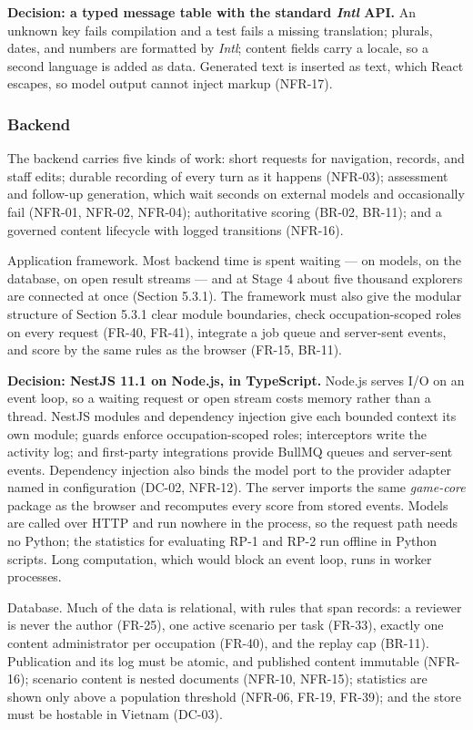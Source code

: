 \textbf{Decision: a typed message table with the standard \textit{Intl} API.} An unknown key fails compilation and a test fails a missing translation; plurals, dates, and numbers are formatted by \textit{Intl}\cite{r149}; content fields carry a locale, so a second language is added as data. Generated text is inserted as text, which React escapes, so model output cannot inject markup (NFR-17)\cite{r150}.

\subsubsection{Backend}

The backend carries five kinds of work: short requests for navigation, records, and staff edits; durable recording of every turn as it happens (NFR-03); assessment and follow-up generation, which wait seconds on external models and occasionally fail (NFR-01, NFR-02, NFR-04); authoritative scoring (BR-02, BR-11); and a governed content lifecycle with logged transitions (NFR-16).

Application framework. Most backend time is spent waiting --- on models, on the database, on open result streams --- and at Stage 4 about five thousand explorers are connected at once (Section 5.3.1). The framework must also give the modular structure of Section 5.3.1 clear module boundaries, check occupation-scoped roles on every request (FR-40, FR-41), integrate a job queue and server-sent events, and score by the same rules as the browser (FR-15, BR-11).

\textbf{Decision: NestJS 11.1 on Node.js, in TypeScript.} Node.js serves I/O on an event loop, so a waiting request or open stream costs memory rather than a thread. NestJS modules and dependency injection give each bounded context its own module; guards enforce occupation-scoped roles; interceptors write the activity log; and first-party integrations provide BullMQ queues and server-sent events\cite{r151}. Dependency injection also binds the model port to the provider adapter named in configuration (DC-02, NFR-12)\cite{r152}. The server imports the same \textit{game-core} package as the browser and recomputes every score from stored events. Models are called over HTTP and run nowhere in the process, so the request path needs no Python; the statistics for evaluating RP-1 and RP-2 run offline in Python scripts. Long computation, which would block an event loop, runs in worker processes.

Database. Much of the data is relational, with rules that span records: a reviewer is never the author (FR-25), one active scenario per task (FR-33), exactly one content administrator per occupation (FR-40), and the replay cap (BR-11). Publication and its log must be atomic, and published content immutable (NFR-16); scenario content is nested documents (NFR-10, NFR-15); statistics are shown only above a population threshold (NFR-06, FR-19, FR-39); and the store must be hostable in Vietnam (DC-03).

